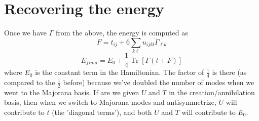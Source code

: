 \documentclass[a4paper,11pt]{article}
\DeclareMathOperator{\Tr}{Tr}
\newcommand{\9}{\,\,\,\,\,\,\,\,\,}
\begin{document}
\section{Recovering the energy}
Once we have $\Gamma$ from the above, the energy is computed as
$$F = t_{ij} + 6\sum_{k\ell}u_{ijkl}\Gamma_{\ell k}$$
$$E_{final} = E_0 + \frac{1}{4}\Tr[\Gamma(t+F)]$$
where $E_0$ is the constant term in the Hamiltonian. The factor of $\frac{1}{4}$ is there (as compared to the $\frac{1}{2}$ before) because we've doubled the number of modes when we went to the Majorana basis. If are we given $U$ and $T$ in the creation/annihilation basis, then when we switch to Majorana modes and antisymmetrize, $U$ will contribute to $t$ (the 'diagonal terms'), and both $U$ and $T$ will contribute to $E_0$.
\end{document}
